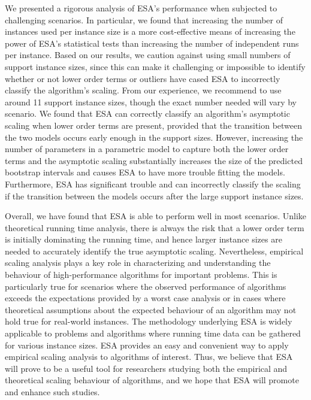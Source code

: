 \documentclass[aic]{iosart2x}
\begin{document}
We presented a rigorous analysis of ESA's performance when subjected to challenging scenarios. In particular, we found that increasing the number of instances used per instance size is a more cost-effective means of increasing the power of ESA's statistical tests than increasing the number of independent runs per instance. Based on our results, we caution against using small numbers of support instance sizes, since this can make it challenging or impossible to identify whether or not lower order terms or outliers have cased ESA to incorrectly classify the algorithm's scaling. From our experience, we recommend to use around 11 support instance sizes, though the exact number needed will vary by scenario. 
We found that ESA can correctly classify an algorithm's asymptotic scaling when lower order terms are present, provided that the transition between the two models occurs early enough in the support sizes. However, increasing the number of parameters in a parametric model to capture both the lower order terms and the asymptotic scaling substantially increases the size of the predicted bootstrap intervals and causes ESA to have more trouble fitting the models. Furthermore, ESA has significant trouble and can incorrectly classify the scaling if the transition between the models occurs after the large support instance sizes. 

Overall, we have found that ESA is able to perform well in most scenarios. Unlike theoretical running time analysis, there is always the risk that a lower order term is initially dominating the running time, and hence larger instance sizes are needed to accurately identify the true asymptotic scaling. Nevertheless, empirical scaling analysis plays a key role in characterizing and understanding the behaviour of high-performance algorithms for important problems. This is particularly true for scenarios where the observed performance of algorithms exceeds the expectations provided by a worst case analysis or in cases where theoretical assumptions about the expected behaviour of an algorithm may not hold true for real-world instances. The methodology underlying ESA is widely applicable to problems and algorithms where running time data can be gathered for various instance sizes. ESA provides an easy and convenient way to apply empirical scaling analysis to algorithms of interest. Thus, we believe that ESA will prove to be a useful tool for researchers studying both the empirical and theoretical scaling behaviour of algorithms, and we hope that ESA will promote and enhance such studies.
\end{document}
